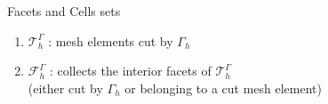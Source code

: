 \begin{frame}{Facets and Cells sets}

    \vspace{15pt}

    \begin{center}
        \begin{minipage}{0.48\linewidth}
            \centering
        \end{minipage} \hfill
        \begin{minipage}{0.48\linewidth}
            \centering
        \end{minipage}
    \end{center}

    \begin{enumerate}[\ding{217}]
        \item $\mathcal{T}_h^\Gamma$ : mesh elements cut by $\Gamma_h$
        \item $\mathcal{F}_h^\Gamma$ : collects the interior facets of $\mathcal{T}_h^\Gamma$ \\
        (either cut by $\Gamma_h$ or belonging to a cut mesh element)
    \end{enumerate}

\end{frame}

